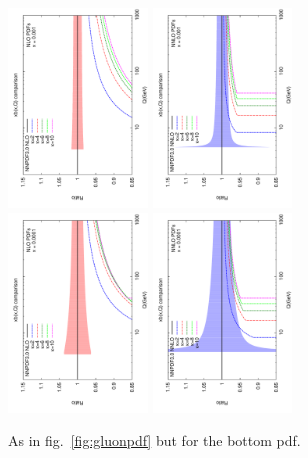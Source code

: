 \documentclass[letter,11pt]{article}
\begin{document}
\begin{figure}[t]
\includegraphics[width=0.33\textwidth,angle=-90]{./bottom_ratio_kb_nlo_x_0001.pdf}
\includegraphics[width=0.33\textwidth,angle=-90]{./bottom_ratio_kb_nnlo_x_0001.pdf}
\includegraphics[width=0.33\textwidth,angle=-90]{./bottom_ratio_kb_nlo_x_00001.pdf}
\includegraphics[width=0.33\textwidth,angle=-90]{./bottom_ratio_kb_nnlo_x_00001.pdf}
\caption{As in fig.~\ref{fig:gluonpdf} but for the bottom pdf.}
\label{fig:bottompdf}
\end{figure}
\end{document}
